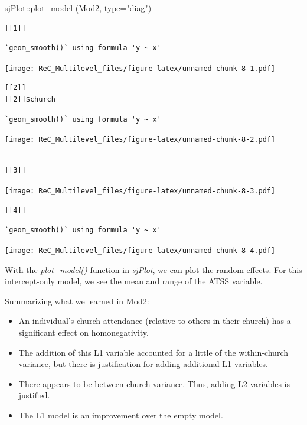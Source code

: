 \documentclass[
  english,
]{book}
\newenvironment{Shaded}{\begin{snugshade}}{\end{snugshade}}
\newcommand{\AttributeTok}[1]{\textcolor[rgb]{0.77,0.63,0.00}{#1}}
\newcommand{\FunctionTok}[1]{\textcolor[rgb]{0.00,0.00,0.00}{#1}}
\newcommand{\NormalTok}[1]{#1}
\newcommand{\SpecialCharTok}[1]{\textcolor[rgb]{0.00,0.00,0.00}{#1}}
\newcommand{\StringTok}[1]{\textcolor[rgb]{0.31,0.60,0.02}{#1}}
\providecommand{\tightlist}{%
  \setlength{\itemsep}{0pt}\setlength{\parskip}{0pt}}
\begin{document}
\begin{Shaded}
\begin{Highlighting}[]
\NormalTok{sjPlot}\SpecialCharTok{::}\FunctionTok{plot\_model}\NormalTok{ (Mod2, }\AttributeTok{type=}\StringTok{"diag"}\NormalTok{)}
\end{Highlighting}
\end{Shaded}

\begin{verbatim}
[[1]]
\end{verbatim}

\begin{verbatim}
`geom_smooth()` using formula 'y ~ x'
\end{verbatim}

\texttt{[image: ReC\_Multilevel\_files/figure-latex/unnamed-chunk-8-1.pdf]}

\begin{verbatim}
[[2]]
[[2]]$church
\end{verbatim}

\begin{verbatim}
`geom_smooth()` using formula 'y ~ x'
\end{verbatim}

\texttt{[image: ReC\_Multilevel\_files/figure-latex/unnamed-chunk-8-2.pdf]}

\begin{verbatim}

[[3]]
\end{verbatim}

\texttt{[image: ReC\_Multilevel\_files/figure-latex/unnamed-chunk-8-3.pdf]}

\begin{verbatim}
[[4]]
\end{verbatim}

\begin{verbatim}
`geom_smooth()` using formula 'y ~ x'
\end{verbatim}

\texttt{[image: ReC\_Multilevel\_files/figure-latex/unnamed-chunk-8-4.pdf]}

With the \emph{plot\_model()} function in \emph{sjPlot}, we can plot the random effects. For this intercept-only model, we see the mean and range of the ATSS variable.

Summarizing what we learned in Mod2:

\begin{itemize}
\tightlist
\item
  An individual's church attendance (relative to others in their church) has a significant effect on homonegativity.
\item
  The addition of this L1 variable accounted for a little of the within-church variance, but there is justification for adding additional L1 variables.
\item
  There appears to be between-church variance. Thus, adding L2 variables is justified.
\item
  The L1 model is an improvement over the empty model.
\end{itemize}
\end{document}
